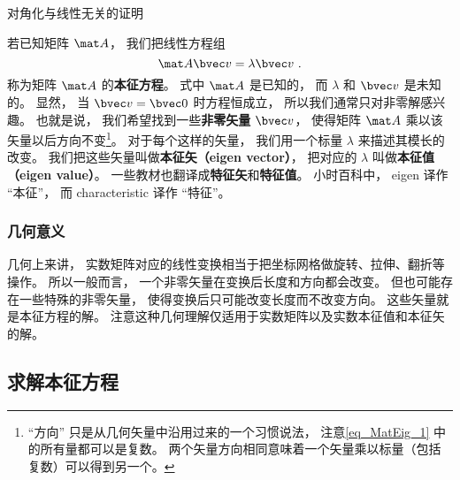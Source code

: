 
\begin{issues}
\issueTODO 对角化与线性无关的证明
\end{issues}



若已知矩阵 $\mat A$， 我们把线性方程组
\begin{equation}\label{eq_MatEig_1}
\mat A \bvec v = \lambda \bvec v~.
\end{equation}
称为矩阵 $\mat A$ 的\textbf{本征方程}。 式中 $\mat A$ 是已知的， 而 $\lambda$ 和 $\bvec v$ 是未知的。 显然， 当 $\bvec v = \bvec 0$ 时方程恒成立， 所以我们通常只对非零解感兴趣。 也就是说， 我们希望找到一些\textbf{非零矢量} $\bvec v$， 使得矩阵 $\mat A$ 乘以该矢量以后方向不变\footnote{“方向” 只是从几何矢量中沿用过来的一个习惯说法， 注意\autoref{eq_MatEig_1} 中的所有量都可以是复数。 两个矢量方向相同意味着一个矢量乘以标量（包括复数）可以得到另一个。}。 对于每个这样的矢量， 我们用一个标量 $\lambda$ 来描述其模长的改变。 我们把这些矢量叫做\textbf{本征矢（eigen vector）}， 把对应的 $\lambda$ 叫做\textbf{本征值（eigen value）}。 一些教材也翻译成\textbf{特征矢}和\textbf{特征值}。 小时百科中， eigen 译作 “本征”， 而 characteristic 译作 “特征”。

\subsubsection{几何意义}
几何上来讲， 实数矩阵对应的线性变换相当于把坐标网格做旋转、拉伸、翻折等操作。%
所以一般而言， 一个非零矢量在变换后长度和方向都会改变。 但也可能存在一些特殊的非零矢量， 使得变换后只可能改变长度而不改变方向。 这些矢量就是本征方程的解。 注意这种几何理解仅适用于实数矩阵以及实数本征值和本征矢的解。

\subsection{求解本征方程}\label{sub_MatEig_1}

